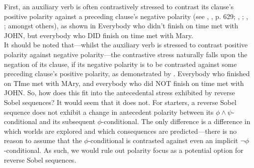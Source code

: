 First, an auxiliary verb is often contrastively stressed to contrast its clause's positive polarity against a preceding clause's negative polarity (see \citeauthor{Romero2004}, \citeyear{Romero2004}, p. 629; \citeauthor{Grimshaw2013}, \citeyear{Grimshaw2013}; \citeauthor{Wilder2013}, \citeyear{Wilder2013}; amongst others), as shown in 
\ex{}
Everybody who didn't finish on time met with \MakeUppercase{John}, but everybody who \MakeUppercase{did} finish on {ti}me met with {Ma}ry.\\\emptyfill\parencite[adapted from][p.~630]{Romero2004}
\xe
It should be noted that---whilst the auxiliary verb is stressed to contrast positive polarity against negative polarity---the contrastive stress naturally falls upon the negation of its clause, if its negative polarity is to be contrasted against some preceding clause's positive polarity, as demonstrated by .
\ex{}
Everybody who finished on \MakeUppercase{ti}me met with \MakeUppercase{Ma}ry, and everybody who did \MakeUppercase{not} finish on time met with \MakeUppercase{John}.\hfill\parencite[p.~630]{Romero2004}
\xe
So, how does this fit into the antecedental stress exhibited by reverse Sobel sequences? It would seem that it does not. For starters, a reverse Sobel sequence does not exhibit a change in antecedent polarity between its $\phi\land\psi$-conditional and its subsequent $\phi$-conditional. The only difference is a difference in which worlds are explored and which consequences are predicted---there is no reason to assume that the $\phi$-conditional is contrasted against even an implicit $\neg\phi$-conditional. As such, we would rule out polarity focus as a potential option for reverse Sobel sequences.

